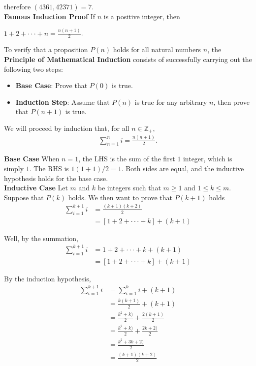 \documentclass[12pt]{article}
\newcommand{\Z}{\mathbb{Z}}
\begin{document}
\noindent
therefore $(4361, 42371)=7$.\\ 

\noindent
\textbf{Famous Induction Proof} If $n$ is a positive integer, then 
\begin{center}
$1+2+ \cdot \cdot \cdot + n = \frac{n(n+1)}{2}$.
\end{center}

\begin{tcolorbox}
To verify that a proposition $P(n)$ holds for all natural numbers $n$, the \textbf{Principle of Mathematical Induction} consists of successfully carrying out the following two steps: 

\begin{itemize}
\item \textbf{Base Case}: Prove that $P(0)$ is true.
\item \textbf{Induction Step}: Assume that $P(n)$ is true for any arbitrary $n$, then prove that $P(n+1)$ is true.
\end{itemize}
\end{tcolorbox}

\vspace{.2cm}
\noindent
We will proceed by induction that, for all $n \in \Z_+$,
\begin{align*}
\sum_{n=1}^{n} i = \frac{n(n+1)}{2}.
\end{align*}

\noindent
\textbf{Base Case} When $n=1$, the LHS is the sum of the first $1$ integer, which is simply $1$. The RHS is $1(1+1)/2=1$. Both sides are equal, and the inductive hypothesis holds for the base case. \\

\noindent
\textbf{Inductive Case} Let $m$ and $k$ be integers such that $m \geq 1$ and $1 \leq k \leq m$. Suppose that $P(k)$ holds. We then want to prove that $P(k+1)$ holds
\begin{align*}
\sum_{i=1}^{k+1} i & = \frac{(k+1)(k+2)}{2} \\
& = [1+2+ \cdot \cdot \cdot + k] + (k+1)
\end{align*}

\noindent
Well, by the summation,
\begin{align*}
\sum_{i=1}^{k+1} i & = 1+2+ \cdot \cdot \cdot + k + (k+1) \\
& = [1+2+ \cdot \cdot \cdot + k] + (k+1)
\end{align*}

\noindent
By the induction hypothesis,
\begin{align*}
\sum_{i=1}^{k+1} i & =  \sum_{i=1}^{k} i  + (k+1) \\
& = \frac{k(k+1)}{2}  + (k+1) \\
& =  \frac{k^2+k)}{2} +  \frac{2(k+1)}{2}\\
& =  \frac{k^2+k)}{2} +  \frac{2k+2)}{2}\\
& =  \frac{k^2+3k+2)}{2} \\
& =  \frac{(k+1)(k+2)}{2}
\end{align*}
\end{document}
